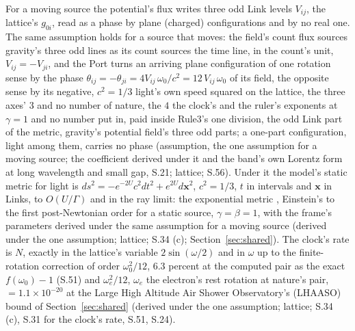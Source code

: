 \documentclass[pdflatex,sn-mathphys-num]{sn-jnl}
\theoremstyle{thmstyleone}
\theoremstyle{thmstyletwo}
\begin{document}
For a moving source the potential's flux writes three odd Link levels $V_{ij}$, the lattice's $g_{0i}$, read as a phase by plane (charged) configurations and by no real one. The same assumption holds for a source that moves: the field's count flux sources gravity's three odd lines as its count sources the time line, in the count's unit, $V_{ij} = -V_{ji}$, and the Port turns an arriving plane configuration of one rotation sense by the phase $\theta_{ij} = -\theta_{ji} = 4V_{ij}\,\omega_0 / c^2 = 12\,V_{ij}\,\omega_0$ of its field, the opposite sense by its negative, $c^2 = 1/3$ light's own speed squared on the lattice, the three axes' $3$ and no number of nature, the $4$ the clock's and the ruler's exponents at $\gamma = 1$ and no number put in, paid inside Rule3's one division, the odd Link part of the metric, gravity's potential field's three odd parts; a one-part configuration, light among them, carries no phase (assumption, the one assumption for a moving source; the coefficient derived under it and the band's own Lorentz form at long wavelength and small gap, S.21; lattice; S.56). Under it the model's static metric for light is $ds^2 = -e^{-2U}c^2dt^2 + e^{2U}d\mathbf x^2$, $c^2 = 1/3$, $t$ in intervals and $\mathbf x$ in Links, to $O(U / \Gamma)$ and in the ray limit: the exponential metric \cite{yilmaz}, Einstein's to the first post-Newtonian order for a static source, $\gamma = \beta = 1$, with the frame's parameters derived under the same assumption for a moving source (derived under the one assumption; lattice; S.34 (c); Section~\ref{sec:shared}). The clock's rate is $N$, exactly in the lattice's variable $2\sin(\omega / 2)$ and in $\omega$ up to the finite-rotation correction of order $\omega_0^2 / 12$, $6.3$ percent at the computed pair as the exact $f(\omega_0) - 1$ (S.51) and $\omega_e^2 / 12$, $\omega_e$ the electron's rest rotation at nature's pair, $= 1.1 \times 10^{-20}$ at the Large High Altitude Air Shower Observatory's (LHAASO) bound of Section~\ref{sec:shared} (derived under the one assumption; lattice; S.34 (c), S.31 for the clock's rate, S.51, S.24).
\end{document}
